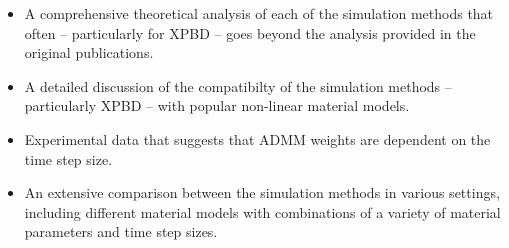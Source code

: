 \begin{itemize}
    \item A comprehensive theoretical analysis of each of the simulation methods that often -- particularly for XPBD -- goes beyond the analysis 
        provided in the original publications. 
    \item A detailed discussion of the compatibilty of the simulation methods -- particularly XPBD -- with popular non-linear material models.
    \item Experimental data that suggests that ADMM weights are dependent on the time step size.
    \item An extensive comparison between the simulation methods in various settings, including different material models with combinations of 
        a variety of material parameters and time step sizes.
\end{itemize}
